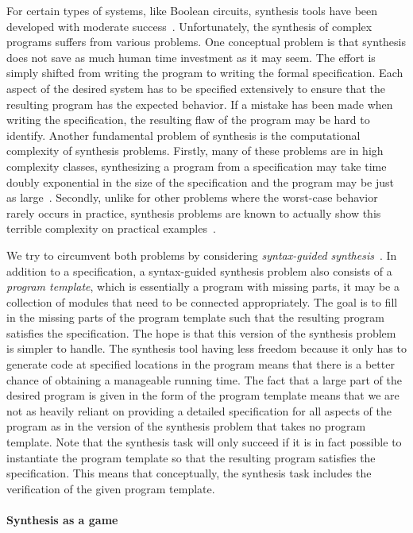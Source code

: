 \documentclass[../../diss.tex]{subfiles}
\begin{document}
For certain types of systems, like Boolean circuits, synthesis tools have been developed with moderate success~\cite{Syntcomp}.
Unfortunately, the synthesis of complex programs suffers from various problems.
One conceptual problem is that synthesis does not save as much human time investment as it may seem.
The effort is simply shifted from writing the program to writing the formal specification.
Each aspect of the desired system has to be specified extensively to ensure that the resulting program has the expected behavior.
If a mistake has been made when writing the specification, the resulting flaw of the program may be hard to identify.
Another fundamental problem of synthesis is the computational complexity of synthesis problems.
Firstly, many of these problems are in high complexity classes, \eg synthesizing a program from a specification may take time doubly exponential in the size of the specification and the program may be just as large~\cite{MuschollSS06}.
Secondly, unlike for other problems where the worst-case behavior rarely occurs in practice, synthesis problems are known to actually show this terrible complexity on practical examples~\cite{Vardi18}.

We try to circumvent both problems by considering \emph{syntax-guided synthesis}~\cite{AlurBDF0JKMMRSSSSTU15,Padhi21}.
In addition to a specification, a syntax-guided synthesis problem also consists of a \emph{program template}, which is essentially a program with missing parts, \eg it may be a collection of modules that need to be connected appropriately.
The goal is to fill in the missing parts of the program template such that the resulting program satisfies the specification.
The hope is that this version of the synthesis problem is simpler to handle.
The synthesis tool having less freedom because it only has to generate code at specified locations in the program means that there is a better chance of obtaining a manageable running time.
The fact that a large part of the desired  program is given in the form of the program template means that we are not as heavily reliant on providing a detailed specification for all aspects of the program as in the version of the synthesis problem that takes no program template.
Note that the synthesis task will only succeed if it is in fact possible to instantiate the program template so that the resulting program satisfies the specification.
This means that conceptually, the synthesis task includes the verification of the given program template.

\paragraph{Synthesis as a game}
\end{document}
